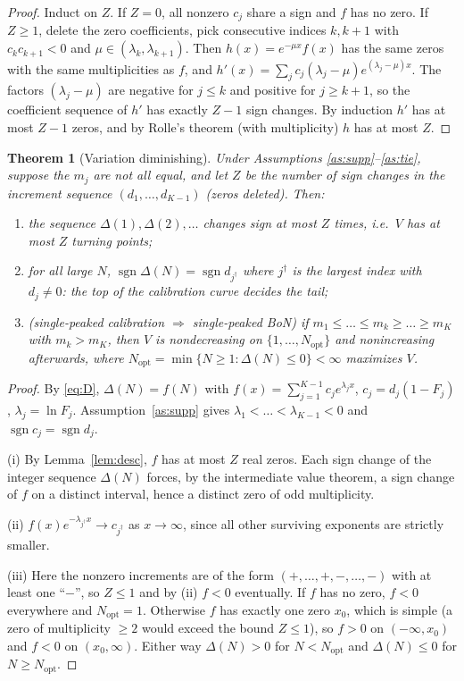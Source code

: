 \documentclass[11pt]{article}
\newtheorem{theorem}{Theorem}
\theoremstyle{definition}
\theoremstyle{remark}
\newcommand{\sgn}{\operatorname{sgn}}
\begin{document}
\begin{proof}
Induct on $Z$. If $Z=0$, all nonzero $c_j$ share a sign and $f$ has no zero. If $Z\ge1$,
delete the zero coefficients, pick consecutive indices $k,k+1$ with $c_kc_{k+1}<0$ and
$\mu\in(\lambda_k,\lambda_{k+1})$. Then $h(x)=e^{-\mu x}f(x)$ has the same zeros with the same
multiplicities as $f$, and
$h'(x)=\sum_j c_j(\lambda_j-\mu)e^{(\lambda_j-\mu)x}$. The factors $(\lambda_j-\mu)$ are negative
for $j\le k$ and positive for $j\ge k+1$, so the coefficient sequence of $h'$ has exactly
$Z-1$ sign changes. By induction $h'$ has at most $Z-1$ zeros, and by Rolle's theorem
(with multiplicity) $h$ has at most $Z$.
\end{proof}

\begin{theorem}[Variation diminishing]\label{thm:K}
Under Assumptions \ref{as:supp}--\ref{as:tie}, suppose the $m_j$ are not all equal, and let
$Z$ be the number of sign changes in the increment sequence $(d_1,\dots,d_{K-1})$ (zeros deleted). Then:
\begin{enumerate}[label=(\roman*)]
\item the sequence $\Delta(1),\Delta(2),\dots$ changes sign at most $Z$ times, i.e.\
$V$ has at most $Z$ turning points;
\item for all large $N$, $\sgn\Delta(N)=\sgn d_{j^\dagger}$ where $j^\dagger$ is the largest
index with $d_j\ne0$: \emph{the top of the calibration curve decides the tail};
\item \emph{(single-peaked calibration $\Rightarrow$ single-peaked BoN)} if
$m_1\le\dots\le m_k\ge\dots\ge m_K$ with $m_k>m_K$, then $V$ is nondecreasing on
$\{1,\dots,N_{\mathrm{opt}}\}$ and nonincreasing afterwards, where
$N_{\mathrm{opt}}=\min\{N\ge1:\Delta(N)\le0\}<\infty$ maximizes $V$.
\end{enumerate}
\end{theorem}

\begin{proof}
By \eqref{eq:D}, $\Delta(N)=f(N)$ with $f(x)=\sum_{j=1}^{K-1}c_je^{\lambda_jx}$,
$c_j=d_j(1-F_j)$, $\lambda_j=\ln F_j$. Assumption~\ref{as:supp} gives
$\lambda_1<\dots<\lambda_{K-1}<0$ and $\sgn c_j=\sgn d_j$.

(i) By Lemma~\ref{lem:desc}, $f$ has at most $Z$ real zeros. Each sign change of the integer
sequence $\Delta(N)$ forces, by the intermediate value theorem, a sign change of $f$ on a
distinct interval, hence a distinct zero of odd multiplicity.

(ii) $f(x)e^{-\lambda_{j^\dagger}x}\to c_{j^\dagger}$ as $x\to\infty$, since all other
surviving exponents are strictly smaller.

(iii) Here the nonzero increments are of the form $(+,\dots,+,-,\dots,-)$ with at least one
``$-$'', so $Z\le1$ and by (ii) $f<0$ eventually. If $f$ has no zero, $f<0$ everywhere and
$N_{\mathrm{opt}}=1$. Otherwise $f$ has exactly one zero $x_0$, which is simple (a zero of
multiplicity $\ge 2$ would exceed the bound $Z\le 1$), so $f>0$ on $(-\infty,x_0)$ and $f<0$ on $(x_0,\infty)$.
Either way $\Delta(N)>0$ for $N<N_{\mathrm{opt}}$ and $\Delta(N)\le0$ for $N\ge N_{\mathrm{opt}}$.
\end{proof}
\end{document}
